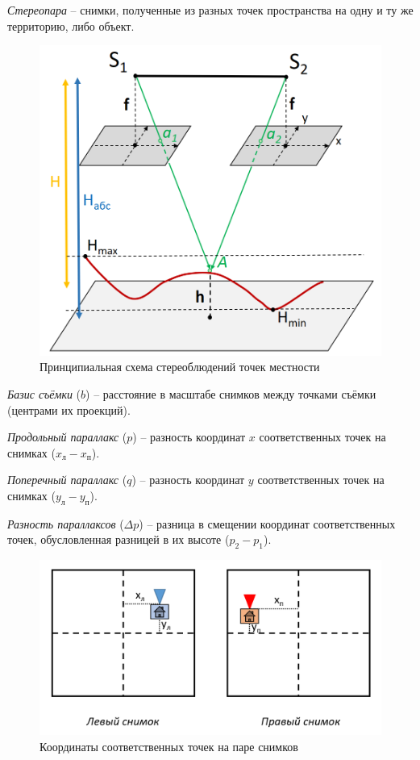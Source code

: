 \documentclass[
  12pt,
]{book}
\begin{document}
\emph{Стереопара} -- снимки, полученные из разных точек пространства на одну и ту же территорию, либо объект.

\begin{figure}
\centering
\includegraphics{images/Stereo/stereopair.png}
\caption{Принципиальная схема стереоблюдений точек местности}
\end{figure}

\emph{Базис съёмки} (\(b\)) -- расстояние в масштабе снимков между точками съёмки (центрами их проекций).

\emph{Продольный параллакс} (\(p\)) -- разность координат \(x\) соответственных точек на снимках (\(x_л - x_п\)).

\emph{Поперечный параллакс} (\(q\)) -- разность координат \(y\) соответственных точек на снимках (\(y_л - y_п\)).

\emph{Разность параллаксов} (\(\Delta p\)) -- разница в смещении координат соответственных точек, обусловленная разницей в их высоте (\(p_2 - p_1\)).

\begin{figure}
\centering
\includegraphics{images/Stereo/parallax.png}
\caption{Координаты соответственных точек на паре снимков}
\end{figure}
\end{document}
